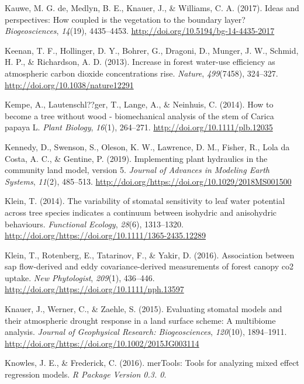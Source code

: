 \documentclass[11pt,twoside]{reedthesis}
\begin{document}
\hypertarget{ref-de_kauwe_ideas_2017}{}
Kauwe, M. G. de, Medlyn, B. E., Knauer, J., \& Williams, C. A. (2017).
Ideas and perspectives: How coupled is the vegetation to the boundary
layer? \emph{Biogeosciences}, \emph{14}(19), 4435--4453.
\url{http://doi.org/10.5194/bg-14-4435-2017}

\hypertarget{ref-Keenan2013}{}
Keenan, T. F., Hollinger, D. Y., Bohrer, G., Dragoni, D., Munger, J. W.,
Schmid, H. P., \& Richardson, A. D. (2013). Increase in forest water-use
efficiency as atmospheric carbon dioxide concentrations rise.
\emph{Nature}, \emph{499}(7458), 324--327.
\url{http://doi.org/10.1038/nature12291}

\hypertarget{ref-Kempe2014}{}
Kempe, A., Lautenschl??ger, T., Lange, A., \& Neinhuis, C. (2014). How
to become a tree without wood - biomechanical analysis of the stem of
Carica papaya L. \emph{Plant Biology}, \emph{16}(1), 264--271.
\url{http://doi.org/10.1111/plb.12035}

\hypertarget{ref-Kennedy2019}{}
Kennedy, D., Swenson, S., Oleson, K. W., Lawrence, D. M., Fisher, R.,
Lola da Costa, A. C., \& Gentine, P. (2019). Implementing plant
hydraulics in the community land model, version 5. \emph{Journal of
Advances in Modeling Earth Systems}, \emph{11}(2), 485--513.
\url{http://doi.org/https://doi.org/10.1029/2018MS001500}

\hypertarget{ref-Klein2014}{}
Klein, T. (2014). The variability of stomatal sensitivity to leaf water
potential across tree species indicates a continuum between isohydric
and anisohydric behaviours. \emph{Functional Ecology}, \emph{28}(6),
1313--1320. \url{http://doi.org/https://doi.org/10.1111/1365-2435.12289}

\hypertarget{ref-Klein2016}{}
Klein, T., Rotenberg, E., Tatarinov, F., \& Yakir, D. (2016).
Association between sap flow-derived and eddy covariance-derived
measurements of forest canopy co2 uptake. \emph{New Phytologist},
\emph{209}(1), 436--446.
\url{http://doi.org/https://doi.org/10.1111/nph.13597}

\hypertarget{ref-Knauer2015}{}
Knauer, J., Werner, C., \& Zaehle, S. (2015). Evaluating stomatal models
and their atmospheric drought response in a land surface scheme: A
multibiome analysis. \emph{Journal of Geophysical Research:
Biogeosciences}, \emph{120}(10), 1894--1911.
\url{http://doi.org/https://doi.org/10.1002/2015JG003114}

\hypertarget{ref-knowles_mertools_2016}{}
Knowles, J. E., \& Frederick, C. (2016). merTools: Tools for analyzing
mixed effect regression models. \emph{R Package Version 0.3. 0}.
\end{document}
